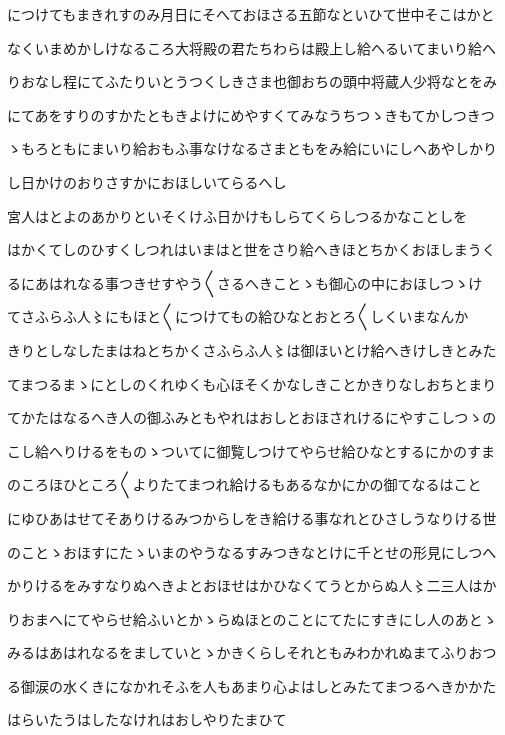 \documentclass[a4paper,11pt,landscape]{ltjtarticle}
\begin{document}
につけてもまきれすのみ月日にそへておほさる五節なといひて世中そこはかと
\par\medskip
なくいまめかしけなるころ大将殿の君たちわらは殿上し給へるいてまいり給へ
\par\medskip
りおなし程にてふたりいとうつくしきさま也御おちの頭中将蔵人少将なとをみ
\par\medskip
にてあをすりのすかたともきよけにめやすくてみなうちつゝきもてかしつきつ
\par\medskip
ゝもろともにまいり給おもふ事なけなるさまともをみ給にいにしへあやしかり
\par\medskip
し日かけのおりさすかにおほしいてらるへし
\par\medskip
宮人はとよのあかりといそくけふ日かけもしらてくらしつるかなことしを
\par\medskip
はかくてしのひすくしつれはいまはと世をさり給へきほとちかくおほしまうく
\par\medskip
るにあはれなる事つきせすやう〱さるへきことゝも御心の中におほしつゝけ
\par\medskip
てさふらふ人〻にもほと〱につけてもの給ひなとおとろ〱しくいまなんか
\par\medskip
きりとしなしたまはねとちかくさふらふ人〻は御ほいとけ給へきけしきとみた
\par\medskip
てまつるまゝにとしのくれゆくも心ほそくかなしきことかきりなしおちとまり
\par\medskip
てかたはなるへき人の御ふみともやれはおしとおほされけるにやすこしつゝの
\par\medskip
こし給へりけるをものゝついてに御覧しつけてやらせ給ひなとするにかのすま
\par\medskip
のころほひところ〱よりたてまつれ給けるもあるなかにかの御てなるはこと
\par\medskip
にゆひあはせてそありけるみつからしをき給ける事なれとひさしうなりける世
\par\medskip
のことゝおほすにたゝいまのやうなるすみつきなとけに千とせの形見にしつへ
\par\medskip
かりけるをみすなりぬへきよとおほせはかひなくてうとからぬ人〻二三人はか
\par\medskip
りおまへにてやらせ給ふいとかゝらぬほとのことにてたにすきにし人のあとゝ
\par\medskip
みるはあはれなるをましていとゝかきくらしそれともみわかれぬまてふりおつ
\par\medskip
る御涙の水くきになかれそふを人もあまり心よはしとみたてまつるへきかかた
\par\medskip
はらいたうはしたなけれはおしやりたまひて
\end{document}

